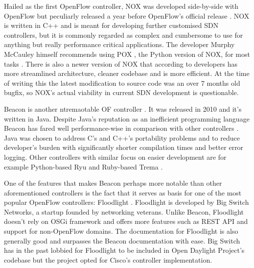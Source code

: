 \documentclass[english]{tktltiki2}
\theoremstyle{definition}
\theoremstyle{remark}
\begin{document}
	Hailed as the first OpenFlow controller, NOX was developed side-by-side with OpenFlow but peculiarly released a year before OpenFlow’s official release \cite{NOX}. NOX is written in C++ and is meant for developing further customised SDN controllers, but it is commonly regarded as complex and cumbersome to use for anything but really performance critical applications. The developer Murphy McCauley himself recommends using POX \cite{POX}, the Python version of NOX, for most tasks \cite{CHU12}. There is also a newer version of NOX that according to developers has more streamlined architecture, cleaner codebase and is more efficient. At the time of writing this the latest modification to source code was an over 7 months old bugfix, so NOX’s actual viability in current SDN development is questionable.

	Beacon is another ntremaotable OF controller \cite{Beacon}. It was released in 2010 and it’s written in Java. Despite Java’s reputation as an inefficient programming language Beacon has fared well performance-wise in comparison with other controllers \cite{Erickson13}. Java was chosen to address C’s and C++’s portability problems and to reduce developer’s burden with significantly shorter compilation times and better error logging. Other controllers with similar focus on easier development are for example Python-based Ryu \cite{Ryu} and Ruby-based Trema \cite{Trema}.

One of the features that makes Beacon perhaps more notable than other aforementioned controllers is the fact that it serves as basis for one of the most popular OpenFlow controllers: Floodlight \cite{Floodlight}. Floodlight is developed by Big Switch Networks, a startup founded by networking veterans. Unlike Beacon, Floodlight doesn’t rely on OSGi framework and offers more features such as REST API and support for non-OpenFlow domains. The documentation for Floodlight is also generally good and surpasses the Beacon documentation with ease.
 Big Switch has in the past lobbied for Floodlight to be included in Open Daylight Project’s codebase \cite{BAN13} but the project opted for Cisco’s controller implementation. 
\end{document}
